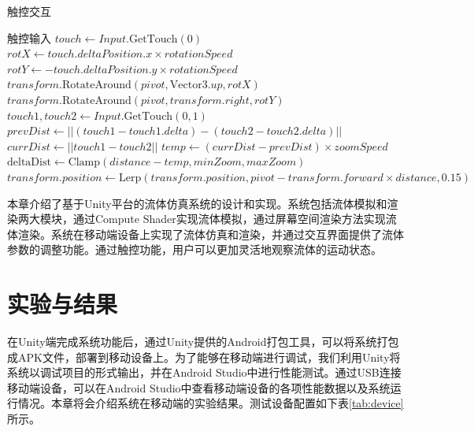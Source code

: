 \begin{algorithm}[ht]
    \caption{触控交互} \label{alg:touchEvent}
    \begin{algorithmic}[1]
    \REQUIRE 触控输入
        \STATE $touch \gets Input.\mbox{GetTouch}(0)$
            \STATE $rotX \gets touch.deltaPosition.x \times rotationSpeed$
            \STATE $rotY \gets -touch.deltaPosition.y \times rotationSpeed$
            \STATE $transform.\mbox{RotateAround}(pivot, \mbox{Vector3}.up, rotX)$
            \STATE $transform.\mbox{RotateAround}(pivot, transform.right, rotY)$
        \ENDIF
        \STATE $touch1, touch2 \gets Input.\mbox{GetTouch}(0,1)$
        \STATE $prevDist \gets ||(touch1 - touch1.delta) - (touch2 - touch2.delta)||$
        \STATE $currDist \gets ||touch1 - touch2||$
        \STATE $temp \gets (currDist - prevDist) \times zoomSpeed$
        \STATE $\mbox{deltaDist} \gets \mbox{Clamp}(distance - temp, minZoom, maxZoom)$
        \STATE $transform.position \gets \mbox{Lerp}(transform.position, pivot - transform.forward \times distance, 0.15)$
    \ENDIF
    \end{algorithmic}
\end{algorithm}





本章介绍了基于Unity平台的流体仿真系统的设计和实现。系统包括流体模拟和渲染两大模块，通过Compute Shader实现流体模拟，通过屏幕空间渲染方法实现流体渲染。系统在移动端设备上实现了流体仿真和渲染，并通过交互界面提供了流体参数的调整功能。通过触控功能，用户可以更加灵活地观察流体的运动状态。



\chapter{实验与结果}\label{experiment}

在Unity端完成系统功能后，通过Unity提供的Android打包工具，可以将系统打包成APK文件，部署到移动设备上。为了能够在移动端进行调试，我们利用Unity将系统以调试项目的形式输出，并在Android Studio中进行性能测试。通过USB连接移动端设备，可以在Android Studio中查看移动端设备的各项性能数据以及系统运行情况。本章将会介绍系统在移动端的实验结果。测试设备配置如下表\ref{tab:device}所示。

